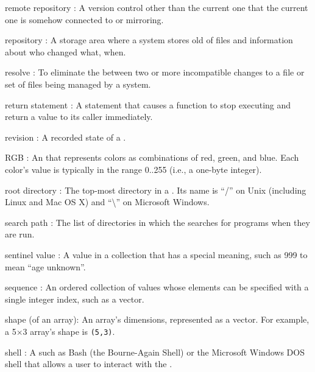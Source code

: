 \documentclass{book}
\begin{document}
\begin{swcdescription}
\item[remote repository]:
A version control
 other than the current one that the
current one is somehow connected to or mirroring.

\item[repository]:
A storage area where a
 system stores old
 of files and information about who
changed what, when.

\item[resolve]:
To eliminate the 
between two or more incompatible changes to a file or set of files being
managed by a  system.

\item[return statement]:
A statement that causes a function to stop
executing and return a value to its caller immediately.

\item[revision]:
A recorded state of a
.

\item[RGB]:
An  that represents colors
as combinations of red, green, and blue. Each color's value is typically
in the range 0..255 (i.e., a one-byte integer).

\item[root directory]:
The top-most directory in a
. Its name is ``/'' on Unix
(including Linux and Mac OS X) and ``\textbackslash{}'' on Microsoft
Windows.
 
\item[search path]:
The list of directories in which the  searches for programs when they are run.

\item[sentinel value]:
A value in a collection that has a special
meaning, such as 999 to mean ``age unknown''.

\item[sequence]:
An ordered collection of values whose elements can be
specified with a single integer index, such as a vector.

\item[shape] (of an array):
An array's dimensions, represented as a
vector. For example, a 5×3 array's shape is \texttt{(5,3)}.

\item[shell]:
A  such as Bash
(the Bourne-Again Shell) or the Microsoft Windows DOS shell that allows
a user to interact with the .


\end{swcdescription}
\end{document}
